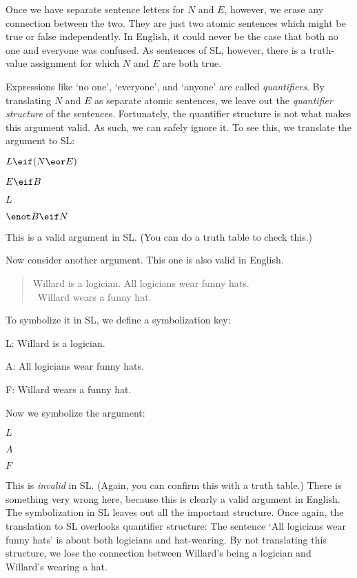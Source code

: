 
Once we have separate sentence letters for $N$ and $E$, however, we erase any connection between the two. They are just two atomic sentences which might be true or false independently. In English, it could never be the case that both no one and everyone was confused. As sentences of SL, however, there is a truth-value assignment for which $N$ and $E$ are both true.

Expressions like `no one', `everyone', and `anyone' are called \emph{quantifiers}. By translating $N$ and $E$ as separate atomic sentences, we leave out the \emph{quantifier structure} of the sentences. Fortunately, the quantifier structure is not what makes this argument valid. As such, we can safely ignore it. To see this, we translate the argument to SL:
\begin{earg}
\item[]$L \eif (N \eor E)$
\item[]$E \eif B$
\item[]$L$
\item[\therefore]$\enot B \eif N$
\end{earg}
This is a valid argument in SL. (You can do a truth table to check this.) 

Now consider another argument. This one is also valid in English.

\begin{quote}
\label{willard1}
Willard is a logician. All logicians wear funny hats.\\
\therefore\ Willard wears a funny hat.
\end{quote}

To symbolize it in SL, we define a symbolization key:
\begin{ekey}
\item[L:] Willard is a logician.
\item[A:] All logicians wear funny hats.
\item[F:] Willard wears a funny hat.
\end{ekey}

Now we symbolize the argument:
\begin{earg}
\item[]$L$
\item[]$A$
\item[\therefore] $F$
\end{earg}

This is \emph{invalid} in SL. (Again, you can confirm this with a truth table.) There is something very wrong here, because this is clearly a valid argument in English. The symbolization in SL leaves out all the important structure. Once again, the translation to SL overlooks quantifier structure: The sentence `All logicians wear funny hats' is about both logicians and hat-wearing. By not translating this structure, we lose the connection between Willard's being a logician and Willard's wearing a hat.

